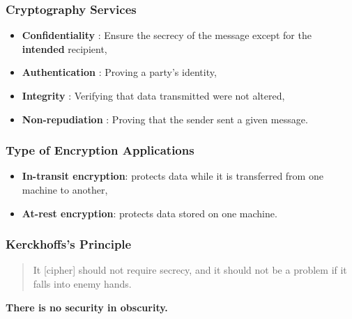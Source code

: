\documentclass{beamer}
\begin{document}
\begin{frame}
        \frametitle{Cryptography Services}

        \begin{itemize}
          \item {\bf Confidentiality }: Ensure the secrecy of the message except for
            the {\bf intended } recipient,
          \item {\bf Authentication }: Proving a party's identity,
          \item {\bf Integrity }: Verifying that data transmitted were not altered,
          \item {\bf Non-repudiation }: Proving that the sender sent a given message.
        \end{itemize}

\end{frame}

\begin{frame}
        \frametitle{Type of Encryption Applications}

        \begin{itemize}
          \item {\bf In-transit encryption}: protects data while it is
            transferred from one machine to another,
          \item {\bf At-rest encryption}: protects data stored on one machine.
        \end{itemize}

\end{frame}

\begin{frame}
        \frametitle{Kerckhoffs's Principle}

        \begin{quote}
          It [cipher] should not require secrecy, and it should not be a problem if it falls into enemy hands.
        \end{quote}

        \vspace{10 mm}

        { \bf There is no security in obscurity.}

\end{frame}
\end{document}
